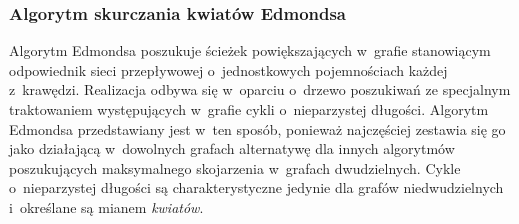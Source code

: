 \subsubsection{\textbf{Algorytm skurczania kwiatów Edmondsa}}\label{ss_edmonds_blossom}
\par{
  Algorytm Edmondsa poszukuje ścieżek powiększających w~grafie stanowiącym odpowiednik sieci przepływowej o~jednostkowych pojemnościach każdej z~krawędzi.
  Realizacja odbywa się w~oparciu o~drzewo poszukiwań ze specjalnym traktowaniem występujących w~grafie cykli o~nieparzystej długości.
  Algorytm Edmondsa przedstawiany jest w~ten sposób, ponieważ najczęściej zestawia się go jako działającą w~dowolnych grafach alternatywę dla innych algorytmów poszukujących maksymalnego skojarzenia w~grafach dwudzielnych.
  Cykle o~nieparzystej długości są charakterystyczne jedynie dla grafów niedwudzielnych i~określane są mianem \emph{kwiatów}.
}
